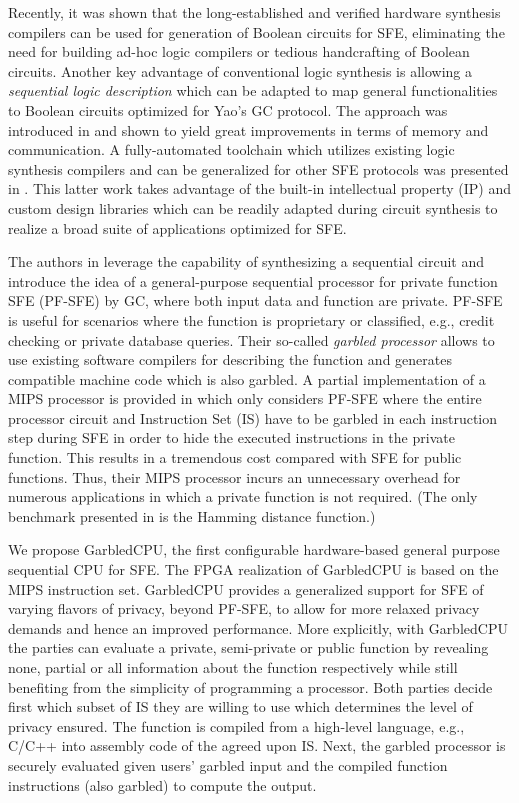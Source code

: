 Recently, it was shown that the long-established and verified hardware synthesis compilers can be used for generation of Boolean circuits for SFE, eliminating the need for building ad-hoc logic compilers or tedious handcrafting of Boolean circuits. Another key advantage of conventional logic synthesis is allowing a \emph{sequential logic description} which can be adapted to map general functionalities to Boolean circuits optimized for Yao's GC protocol. The approach was introduced in \cite{songhori2015tinygarble} and shown to yield great improvements in terms of memory and communication. A fully-automated toolchain which utilizes existing logic synthesis compilers and can be generalized for other SFE protocols was presented in \cite{demmler2015automated}. This latter work takes advantage of the built-in intellectual property (IP) and custom design libraries which can be readily adapted during circuit synthesis to realize a broad suite of applications optimized for SFE.

The authors in \cite{songhori2015tinygarble} leverage the capability of synthesizing a sequential circuit and introduce the idea of a general-purpose sequential processor for private function SFE (PF-SFE) by GC, where both input data and function are private. PF-SFE is useful for scenarios where the function is proprietary or classified, e.g., credit checking or private database queries. Their so-called \emph{garbled processor} allows to use existing software compilers for describing the function and generates compatible machine code which is also garbled. A partial implementation of a MIPS processor is provided in \cite{songhori2015tinygarble} which only considers PF-SFE where the entire processor circuit and Instruction Set (IS) have to be garbled in each instruction step during SFE in order to hide the executed instructions in the private function. This results in a tremendous cost compared with SFE for public functions. Thus, their MIPS processor incurs an unnecessary overhead for numerous applications in which a private function is not required. (The only benchmark presented in \cite{songhori2015tinygarble} is the Hamming distance function.)

We propose GarbledCPU, the first configurable hardware-based general purpose sequential CPU for SFE. The FPGA realization of GarbledCPU is based on the MIPS instruction set. GarbledCPU provides a generalized support for SFE of varying flavors of privacy, beyond PF-SFE, to allow for more relaxed privacy demands and hence an improved performance. More explicitly, with GarbledCPU the parties can evaluate a private, semi-private or public function by revealing none, partial or all information about the function respectively while still benefiting from the simplicity of programming a processor.
Both parties decide first which subset of IS they are willing to use which determines the level of privacy ensured. The function is compiled from a high-level language, e.g., C/C++ into assembly code of the agreed upon IS. Next, the garbled processor is securely evaluated given users' garbled input and the compiled function instructions (also garbled) to compute the output.

